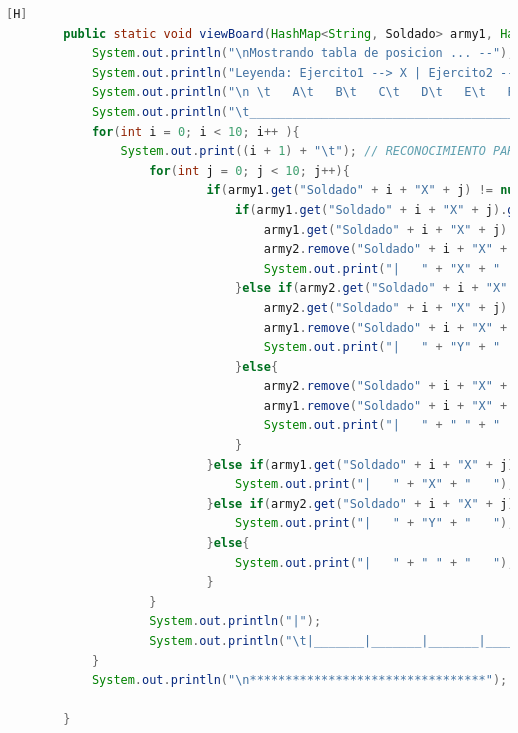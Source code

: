 \documentclass{article}
\begin{document}
	\begin{lstlisting}[language=java,caption={Las lineas de codigos del metodo creado:}][H]
		public static void viewBoard(HashMap<String, Soldado> army1, HashMap<String, Soldado> army2){ //EN ESTE METODO DEMOSTRAREMOS LA TABLA REUTILIZAREMOS CODIGOS DE ANTERIORES LABORATORIOS PARA PODER HACER LA BASE DE ESTE TABLERO
			System.out.println("\nMostrando tabla de posicion ... --");
			System.out.println("Leyenda: Ejercito1 --> X | Ejercito2 --> Y"); //RECONOCIMIENTO PARA LOS EJERCITOS Y POSICION DE SUS SOLDADOS
			System.out.println("\n \t   A\t   B\t   C\t   D\t   E\t   F\t   G\t   H\t   I\t   J"); // RECONOCIMIENTO PARA CADA UBICACION DE CADA SOLDADO EN EL TABLERO POR PARTE DE LAS COLUMNAS
			System.out.println("\t_________________________________________________________________________________");
			for(int i = 0; i < 10; i++ ){
				System.out.print((i + 1) + "\t"); // RECONOCIMIENTO PARA CADA UBICACION DE CADA SOLDADO EN EL TABLERO POR PARTE DE LAS FILAS
					for(int j = 0; j < 10; j++){
							if(army1.get("Soldado" + i + "X" + j) != null && army2.get("Soldado" + i + "X" + j) != null){ //CREAMOS UN IF PARA QUE ESTE NOS AYUDE A SABER QUIEN DE ESTOS SOLDADOS SE OCUPARA DEL CASILLERO EL CUAL DONDE ESTAN PELEANDO
								if(army1.get("Soldado" + i + "X" + j).getHealth() > army2.get("Soldado" + i + "X" + j).getHealth()){
									army1.get("Soldado" + i + "X" + j).setHealth(army1.get("Soldado" + i + "X" + j).getHealth() - army2.get("Soldado" + i + "X" + j).getHealth());
									army2.remove("Soldado" + i + "X" + j);
									System.out.print("|   " + "X" + "   ");
								}else if(army2.get("Soldado" + i + "X" + j) != null && army1.get("Soldado" + i + "X" + j) != null){
									army2.get("Soldado" + i + "X" + j).setHealth(army2.get("Soldado" + i + "X" + j).getHealth() - army1.get("Soldado" + i + "X" + j).getHealth());
									army1.remove("Soldado" + i + "X" + j);
									System.out.print("|   " + "Y" + "   ");
								}else{
									army2.remove("Soldado" + i + "X" + j);
									army1.remove("Soldado" + i + "X" + j);
									System.out.print("|   " + " " + "   ");
								}
							}else if(army1.get("Soldado" + i + "X" + j) != null){
								System.out.print("|   " + "X" + "   ");
							}else if(army2.get("Soldado" + i + "X" + j) != null){
								System.out.print("|   " + "Y" + "   ");
							}else{
								System.out.print("|   " + " " + "   ");
							}
					}
					System.out.println("|");
					System.out.println("\t|_______|_______|_______|_______|_______|_______|_______|_______|_______|_______|");
			}
			System.out.println("\n*********************************");
		
		}
		\end{lstlisting}
\end{document}

